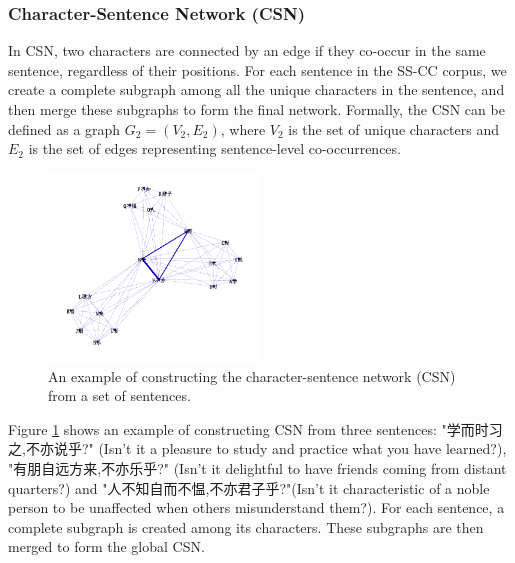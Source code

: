 \documentclass[11pt]{article}
\begin{document}
\subsubsection{Character-Sentence Network (CSN)}
In CSN, two characters are connected by an edge if they co-occur in the same sentence, regardless of their positions. For each sentence in the SS-CC corpus, we create a complete subgraph among all the unique characters in the sentence, and then merge these subgraphs to form the final network. Formally, the CSN can be defined as a graph $G_2=(V_2,E_2)$, where $V_2$ is the set of unique characters and $E_2$ is the set of edges representing sentence-level co-occurrences.
\begin{figure}[htbp]
    \centering
    \includegraphics[width=0.5\textwidth]{../example/csn_example.png}
    \caption{An example of constructing the character-sentence network (CSN) from a set of sentences.}
    \label{fig:csn_example}
    \end{figure}
Figure \ref{fig:csn_example} shows an example of constructing CSN from three sentences: "学而时习之,不亦说乎?" (Isn't it a pleasure to study and practice what you have learned?), "有朋自远方来,不亦乐乎?" (Isn't it delightful to have friends coming from distant quarters?) and "人不知自而不愠,不亦君子乎?"(Isn't it characteristic of a noble person to be unaffected when others misunderstand them?). For each sentence, a complete subgraph is created among its characters. These subgraphs are then merged to form the global CSN.
\end{document}
